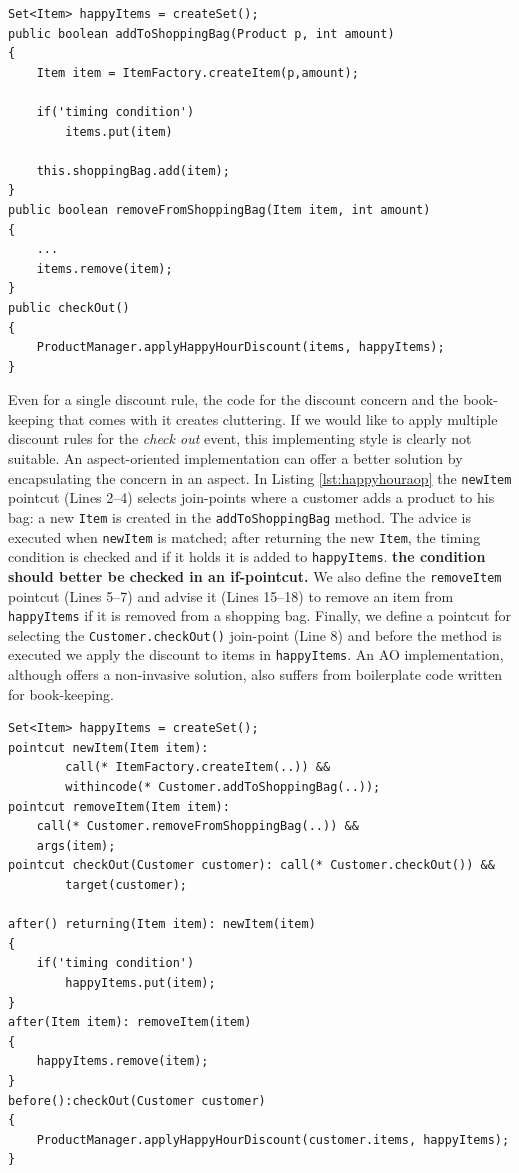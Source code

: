 \begin{lstlisting}[float, caption={A Java implementation of Happy-hour discount rule}, label={lst:happyhour}]
Set<Item> happyItems = createSet();
public boolean addToShoppingBag(Product p, int amount)
{
	Item item = ItemFactory.createItem(p,amount);
	
	if('timing condition')
		items.put(item)
	
	this.shoppingBag.add(item);
}
public boolean removeFromShoppingBag(Item item, int amount)
{
	...
	items.remove(item);
}
public checkOut()
{
	ProductManager.applyHappyHourDiscount(items, happyItems);
}
\end{lstlisting}

Even for a single discount rule, the code for the discount concern and the book-keeping that comes with it creates cluttering. If we would like to apply multiple discount rules for the \emph{check out} event, this implementing style is clearly not suitable.
An aspect-oriented implementation can offer a better solution by encapsulating the concern in an aspect. In Listing \ref{lst:happyhouraop} the \texttt{newItem} pointcut (Lines 2--4) selects join-points where a customer adds a product to his bag: a new \texttt{Item} is created in the \texttt{addToShoppingBag} method. The advice is executed when \texttt{newItem} is matched; after returning the new \texttt{Item}, the timing condition is checked and if it holds it is added to \texttt{happyItems}. \textbf{the condition should better be checked in an if-pointcut.}
We also define the \texttt{removeItem} pointcut (Lines 5--7) and advise it (Lines 15--18) to remove an item from \texttt{happyItems} if it is removed from a shopping bag.
Finally, we define a pointcut for selecting the \texttt{Customer.checkOut()} join-point (Line 8) and before the method is executed we apply the discount to items in \texttt{happyItems}.
An AO implementation, although offers a non-invasive solution, also suffers from boilerplate code written for book-keeping. 

\begin{lstlisting}[float, caption={An Aspectj implementation of Happy-hour discount rule}, label={lst:happyhouraop}]
Set<Item> happyItems = createSet();
pointcut newItem(Item item): 
		call(* ItemFactory.createItem(..)) && 
		withincode(* Customer.addToShoppingBag(..));
pointcut removeItem(Item item): 
	call(* Customer.removeFromShoppingBag(..)) && 
	args(item);
pointcut checkOut(Customer customer): call(* Customer.checkOut()) &&
        target(customer);

after() returning(Item item): newItem(item)
{
	if('timing condition')
		happyItems.put(item);
}
after(Item item): removeItem(item)
{
	happyItems.remove(item);
}
before():checkOut(Customer customer)
{
	ProductManager.applyHappyHourDiscount(customer.items, happyItems);
}
\end{lstlisting}

